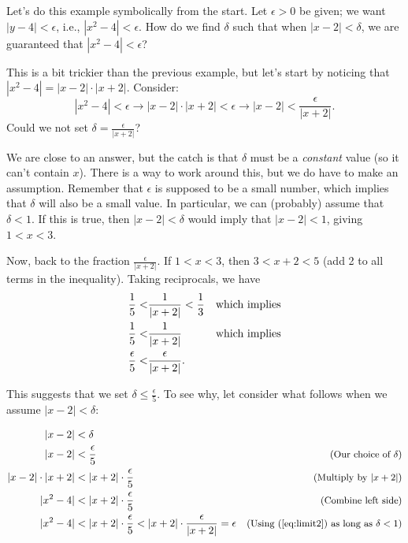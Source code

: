 \begin{solution}
{Let's do this example symbolically from the start.  Let $\epsilon > 0$ be given; we want $|y-4| < \epsilon$, i.e.,  $|x^2-4| < \epsilon$.  How do we find $\delta$ such that when $|x-2| < \delta$, we are guaranteed that $|x^2-4|<\epsilon$?%

This is a bit trickier than the previous example, but let's start by noticing that 
$|x^2-4| = |x-2|\cdot|x+2|$.  Consider:\\
\begin{equation} |x^2-4| < \epsilon \longrightarrow |x-2|\cdot|x+2| < \epsilon \longrightarrow |x-2| < \frac{\epsilon}{|x+2|}.\label{eq:limit1}\end{equation} 
Could we not set $\displaystyle \delta = \frac{\epsilon}{|x+2|}$?  

We are close to an answer, but the catch is that $\delta$ must be a \textit{constant} value (so it can't contain $x$).  There is a way to work around this, but we do have to make an assumption.  Remember that $\epsilon$ is supposed to be a small number, which implies that $\delta$ will also be a small value.  In particular, we can (probably) assume that $\delta < 1$.  If this is true, then $|x-2| < \delta$ would imply that $|x-2| < 1$, giving $1 < x < 3$.  

Now, back to the fraction $\displaystyle \frac{\epsilon}{|x+2|}$.  If $1<x<3$, then $3<x+2<5$ (add 2 to all terms in the inequality).  Taking reciprocals, we have 
\begin{align}
\frac15 <& \frac1{|x+2|} < \frac 13 & \text{which implies}\notag\\
\frac15 <& \frac1{|x+2|} & \text{which implies}\notag\\
\frac\epsilon5<&\frac{\epsilon}{|x+2|}.\label{eq:limit2}
\end{align}

This suggests that we set 
$\displaystyle \delta \leq \frac{\epsilon}{5}$. To see why, let consider what follows when we assume $|x-2|<\delta$:

\small
\begin{align*}
|x - 2| &< \delta &\\
|x - 2| &< \frac{\epsilon}{5}&  \text{\small(Our choice of $\delta$)}\\
|x - 2|\cdot|x + 2| &< |x + 2|\cdot\frac{\epsilon}{5}&  \text{\small(Multiply by $|x+2|$)}\\
|x^2 - 4|&< |x + 2|\cdot\frac{\epsilon}{5}&  \text{\small(Combine left side)}\\
|x^2 - 4|&< |x + 2|\cdot\frac{\epsilon}{5}< |x + 2|\cdot\frac{\epsilon}{|x+2|}=\epsilon &  
\text{\small(Using (\ref{eq:limit2}) as long as $\delta <1$)}
\end{align*}
\normalsize

}
\end{solution}
